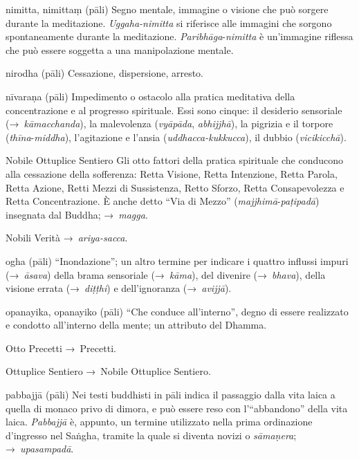 \begin{glossarydescription}
\item[nimitta, nimittaṃ] (pāli) Segno mentale, immagine o visione che può
  sorgere durante la meditazione. \emph{Uggaha-nimitta} si riferisce alle
  immagini che sorgono spontaneamente durante la meditazione.
  \emph{Paribhāga}-\emph{nimitta} è un'immagine riflessa che può essere soggetta
  a una manipolazione mentale.

\item[nirodha] (pāli) Cessazione, dispersione, arresto.

\item[nīvaraṇa] (pāli) Impedimento o ostacolo alla pratica meditativa della
  concentrazione e al progresso spirituale. Essi sono cinque: il desiderio
  sensoriale (→~\emph{kāmacchanda}), la malevolenza (\emph{vyāpāda},
  \emph{abhijjhā}), la pigrizia e il torpore (\emph{thīna}-\emph{middha}),
  l'agitazione e l'ansia (\emph{uddhacca-kukkucca}), il dubbio
  (\emph{vicikicchā}).

\item[Nobile Ottuplice Sentiero] \label{glossary-ottuplice} Gli otto fattori della pratica spirituale che
  conducono alla cessazione della sofferenza: Retta Visione, Retta Intenzione,
  Retta Parola, Retta Azione, Retti Mezzi di Sussistenza, Retto Sforzo, Retta
  Consapevolezza e Retta Concentrazione. È anche detto ``Via di Mezzo''
  (\emph{majjhimā}-\emph{paṭipadā}) insegnata dal Buddha; →~\emph{magga}.

\item[Nobili Verità] →~\emph{ariya-sacca}.


\item[ogha] (pāli) ``Inondazione''; un altro termine per indicare i quattro
  influssi impuri (→~\emph{āsava}) della brama sensoriale (→~\emph{kāma}), del
  divenire (→~\emph{bhava}), della visione errata (→~\emph{diṭṭhi}) e
  dell'ignoranza (→~\emph{avijjā}).

\item[opanayika, opanayiko] (pāli) ``Che conduce all'interno'', degno di essere
  realizzato e condotto all'interno della mente; un attributo del Dhamma.

\item[Otto Precetti] →~Precetti.

\item[Ottuplice Sentiero] →~Nobile Ottuplice Sentiero.


\item[pabbajjā] (pāli) Nei testi buddhisti in pāli indica il passaggio dalla
  vita laica a quella di monaco privo di dimora, e può essere reso con
  l'``abbandono'' della vita laica. \emph{Pabbajjā} è, appunto, un termine
  utilizzato nella prima ordinazione d'ingresso nel Saṅgha, tramite la quale si
  diventa novizi o \emph{sāmaṇera}; →~\emph{upasampadā}.


\end{glossarydescription}
